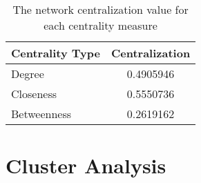 \begin{table}
	\begin{tabular}{l|c}
		\bfseries Centrality Type & \bfseries Centralization \\
		\hline
		Degree & 0.4905946 \\
		\hline
		Closeness & 0.5550736 \\
		\hline
		Betweenness & 0.2619162
	\end{tabular}
	\centering
	\caption{The network centralization value for each centrality measure}\label{tab:centralization}
\end{table}
\section{Cluster Analysis}\label{clustersection}